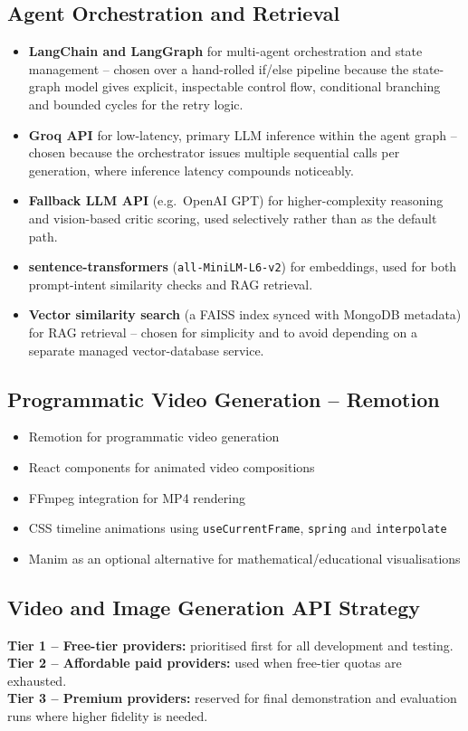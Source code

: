 \documentclass[11pt,a4paper]{article}
\begin{document}
\subsection{Agent Orchestration and Retrieval}
\begin{itemize}[leftmargin=*]
\item \textbf{LangChain and LangGraph} for multi-agent orchestration and state management -- chosen over a hand-rolled if/else pipeline because the state-graph model gives explicit, inspectable control flow, conditional branching and bounded cycles for the retry logic.
\item \textbf{Groq API} for low-latency, primary LLM inference within the agent graph -- chosen because the orchestrator issues multiple sequential calls per generation, where inference latency compounds noticeably.
\item \textbf{Fallback LLM API} (e.g.\ OpenAI GPT) for higher-complexity reasoning and vision-based critic scoring, used selectively rather than as the default path.
\item \textbf{sentence-transformers} (\texttt{all-MiniLM-L6-v2}) for embeddings, used for both prompt-intent similarity checks and RAG retrieval.
\item \textbf{Vector similarity search} (a FAISS index synced with MongoDB metadata) for RAG retrieval -- chosen for simplicity and to avoid depending on a separate managed vector-database service.
\end{itemize}

\subsection{Programmatic Video Generation -- Remotion}
\begin{itemize}[leftmargin=*]
\item Remotion for programmatic video generation
\item React components for animated video compositions
\item FFmpeg integration for MP4 rendering
\item CSS timeline animations using \texttt{useCurrentFrame}, \texttt{spring} and \texttt{interpolate}
\item Manim as an optional alternative for mathematical/educational visualisations
\end{itemize}

\subsection{Video and Image Generation API Strategy}
\textbf{Tier 1 -- Free-tier providers:} prioritised first for all development and testing.\\
\textbf{Tier 2 -- Affordable paid providers:} used when free-tier quotas are exhausted.\\
\textbf{Tier 3 -- Premium providers:} reserved for final demonstration and evaluation runs where higher fidelity is needed.
\end{document}

